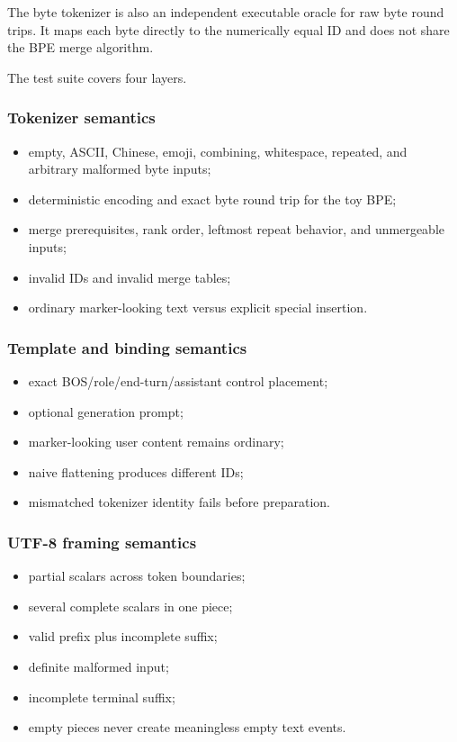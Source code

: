 \documentclass[
  10pt,
]{article}
\providecommand{\tightlist}{%
  \setlength{\itemsep}{0pt}\setlength{\parskip}{0pt}}
\begin{document}
The byte tokenizer is also an independent executable oracle for raw byte
round trips. It maps each byte directly to the numerically equal ID and
does not share the BPE merge algorithm.

The test suite covers four layers.

\subsubsection{Tokenizer semantics}\label{tokenizer-semantics}

\begin{itemize}
\tightlist
\item
  empty, ASCII, Chinese, emoji, combining, whitespace, repeated, and
  arbitrary malformed byte inputs;
\item
  deterministic encoding and exact byte round trip for the toy BPE;
\item
  merge prerequisites, rank order, leftmost repeat behavior, and
  unmergeable inputs;
\item
  invalid IDs and invalid merge tables;
\item
  ordinary marker-looking text versus explicit special insertion.
\end{itemize}

\subsubsection{Template and binding
semantics}\label{template-and-binding-semantics}

\begin{itemize}
\tightlist
\item
  exact BOS/role/end-turn/assistant control placement;
\item
  optional generation prompt;
\item
  marker-looking user content remains ordinary;
\item
  naive flattening produces different IDs;
\item
  mismatched tokenizer identity fails before preparation.
\end{itemize}

\subsubsection{UTF-8 framing semantics}\label{utf-8-framing-semantics}

\begin{itemize}
\tightlist
\item
  partial scalars across token boundaries;
\item
  several complete scalars in one piece;
\item
  valid prefix plus incomplete suffix;
\item
  definite malformed input;
\item
  incomplete terminal suffix;
\item
  empty pieces never create meaningless empty text events.
\end{itemize}
\end{document}
